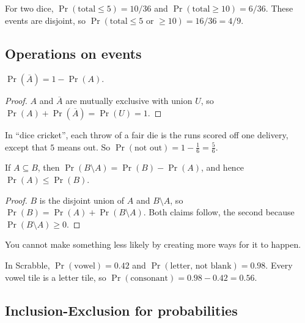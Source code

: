 \begin{example}
For two dice, $\Pr(\text{total}\le5)=10/36$ and $\Pr(\text{total}\ge10)=6/36$. These events are disjoint, so $\Pr(\text{total}\le5\text{ or }\ge10)=16/36=4/9$.
\end{example}

\subsection{Operations on events}
\label{sec:9-5}

\begin{proposition}[Complement]
$\Pr(\overline{A}) = 1-\Pr(A)$.
\end{proposition}
\begin{proof}
$A$ and $\overline A$ are mutually exclusive with union $U$, so $\Pr(A)+\Pr(\overline A)=\Pr(U)=1$.
\end{proof}

\begin{example}
In ``dice cricket'', each throw of a fair die is the runs scored off one delivery, except that $5$ means out. So $\Pr(\text{not out})=1-\frac16=\frac56$.
\end{example}

\begin{proposition}
If $A\subseteq B$, then $\Pr(B\setminus A)=\Pr(B)-\Pr(A)$, and hence $\Pr(A)\le\Pr(B)$.
\end{proposition}
\begin{proof}
$B$ is the disjoint union of $A$ and $B\setminus A$, so $\Pr(B)=\Pr(A)+\Pr(B\setminus A)$. Both claims follow, the second because $\Pr(B\setminus A)\ge0$.
\end{proof}

\begin{note}[In words]
You cannot make something less likely by creating more ways for it to happen.
\end{note}

\begin{example}
In Scrabble, $\Pr(\text{vowel})=0.42$ and $\Pr(\text{letter, not blank})=0.98$. Every vowel tile is a letter tile, so $\Pr(\text{consonant})=0.98-0.42=0.56$.
\end{example}

\subsection{Inclusion-Exclusion for probabilities}
\label{sec:9-6}

